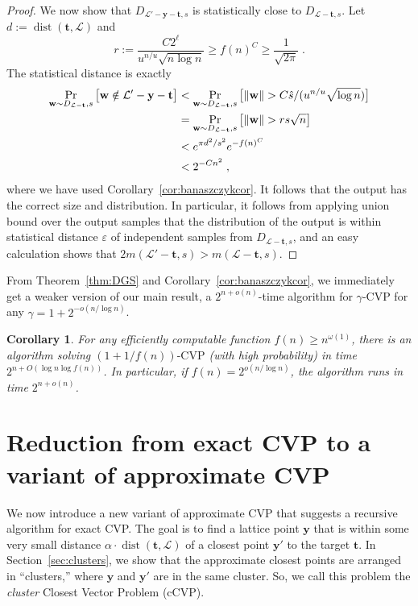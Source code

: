 \documentclass[11pt]{article}
\newtheorem{corollary}[theorem]{Corollary}
\newcommand{\eps}{\varepsilon}
\renewcommand{\vec}[1]{\ensuremath{\mathbf{#1}}}
\newcommand{\problem}[1]{\mbox{#1}\xspace}
\newcommand{\scarequotes}[1]{``#1''}
\newcommand{\lat}{\mathcal{L}}
\DeclareMathOperator{\dist}{dist}
\DeclarePairedDelimiter\length{\lVert}{\rVert}
\begin{document}
\begin{proof}
We now show that $D_{\lat' -\vec{y} - \vec{t}, s}$ is statistically close to $D_{\lat - \vec{t}, s}$. Let $d := \dist(\vec{t}, \lat)$ and 
\[
r := \frac{C 2^\ell}{u^{n/u} \sqrt{n \log n}} \geq f(n)^C \geq \frac{1}{\sqrt{2\pi}}
\; .
\] The statistical distance is exactly 
\begin{align*}
\Pr_{\vec{w} \sim D_{\lat - \vec{t}}, s} \big[\vec{w} \notin \lat' - \vec{y} - \vec{t} \big] &< \Pr_{\vec{w} \sim D_{\lat - \vec{t}}, s} \big[\length{\vec{w}} > C\hat{s}/(u^{n/u}\sqrt{\log n}) \big]\\
&= \Pr_{\vec{w} \sim D_{\lat - \vec{t}}, s} \big[\length{\vec{w}} > rs \sqrt{n} \big]\\
&< e^{\pi d^2/s^2} e^{- f(n)^C}\\
&< 2^{-C n^2}
\; ,
\end{align*}
where we have used Corollary~\ref{cor:banaszczykcor}. It follows that the output has the correct size and distribution. In particular, it follows from applying union bound over the output samples that the distribution of the output is within statistical distance $\eps$ of independent samples from $D_{\lat - \vec{t}, s}$, and an easy calculation shows that $2m(\lat' - \vec{t}, s) > m(\lat - \vec{t}, s)$.
\end{proof}

From Theorem~\ref{thm:DGS} and Corollary~\ref{cor:banaszczykcor}, we immediately get a weaker version of our main result, a $2^{n+o(n)}$-time algorithm for $\gamma\text{-}\problem{CVP}$ for any $\gamma = 1+2^{-o(n/\log n)}$. 


\begin{corollary}
\label{cor:approxCVP}
For any efficiently computable function $f(n) \geq n^{\omega(1)}$, there is an algorithm solving $(1+1/f(n))\text{-}\problem{CVP}$ (with high probability) in time 
$
2^{n+O(\log n \log f(n))}
$. In particular, if $f(n) = 2^{o(n/\log n)}$, the algorithm runs in time $2^{n+o(n)}$.
\end{corollary}

\section{Reduction from exact CVP to a variant of approximate CVP}
\label{sec:CVPtoneighbor}
We now introduce a new variant of approximate \problem{CVP} that suggests a recursive algorithm for exact \problem{CVP}. The goal is to find a lattice point $\vec{y}$ that is within some very small distance $\alpha \cdot \dist(\vec{t}, \lat)$ of a closest point $\vec{y}'$ to the target $\vec{t}$. In Section~\ref{sec:clusters}, we show that the approximate closest points are arranged in \scarequotes{clusters,} where $\vec{y}$ and $\vec{y}'$ are in the same cluster. So, we call this problem the \emph{cluster} Closest Vector Problem (cCVP). 
\end{document}
